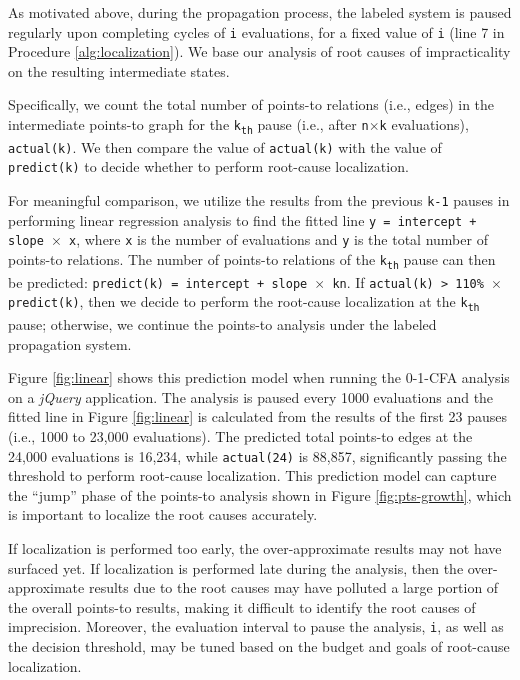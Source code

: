 As motivated above, during the propagation process, the labeled system is paused regularly upon completing cycles of {\tt i} evaluations, for a fixed value of {\tt i} (line 7 in Procedure \ref{alg:localization}). We base our analysis of root causes of impracticality on the resulting intermediate states.

Specifically, we count the total number of points-to relations (i.e., edges) in the intermediate points-to graph for the {\tt k\textsubscript{th}} pause (i.e., after {\tt n$\times$k} evaluations), {\tt actual(k)}. We then compare the value of {\tt actual(k)} with the value of {\tt predict(k)} to decide whether to perform root-cause localization. 

For meaningful comparison, we utilize the results from the previous {\tt k-1} pauses in performing linear regression analysis to find the fitted line {\tt y = intercept + slope $\times$ x}, where {\tt x} is the number of evaluations and {\tt y} is the total number of points-to relations. The number of points-to relations of the {\tt k\textsubscript{th}} pause can then be predicted: {\tt predict(k) = intercept + slope $\times$ kn}. If {\tt actual(k) > 110\% $\times$ predict(k)}, then we decide to perform the root-cause localization at the {\tt k\textsubscript{th}} pause; otherwise, we continue the points-to analysis under the labeled propagation system. 

Figure \ref{fig:linear} shows this prediction model when running the 0-1-CFA analysis on a {\it jQuery} application. The analysis is paused every 1000 evaluations and the fitted line in Figure \ref{fig:linear} is calculated from the results of the first 23 pauses (i.e., 1000 to 23,000 evaluations). The predicted total points-to edges at the 24,000 evaluations is 16,234, while {\tt actual(24)} is 88,857, significantly passing the threshold to perform root-cause localization. This prediction model can capture the ``jump'' phase of the points-to analysis shown in Figure \ref{fig:pts-growth}, which is important to localize the root causes accurately. 

If localization is performed too early, the over-approximate results may not have surfaced yet. If localization is performed late during the analysis, then the over-approximate results due to the root causes may have polluted a large portion of the overall points-to results, making it difficult to identify the root causes of imprecision. Moreover, the evaluation interval to pause the analysis, {\tt i}, as well as the decision threshold, may be tuned based on the budget and goals of root-cause localization.

